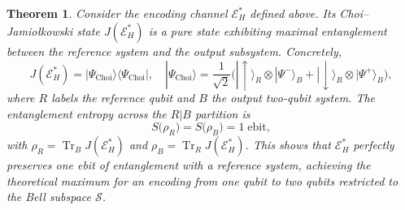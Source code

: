 \documentclass[10pt,a4paper]{amsart}
\newtheorem{theorem}{Theorem}
\begin{document}
\begin{theorem}\label{thm:entropy}
Consider the encoding channel $\mathcal{E}_H^*$ defined above. Its Choi–Jamiołkowski state $J(\mathcal{E}_H^*)$ is a pure state exhibiting maximal entanglement between the reference system and the output subsystem. Concretely,
\[
J(\mathcal{E}_H^*) = |\Psi_{\mathrm{Choi}}\rangle\langle\Psi_{\mathrm{Choi}}|,
\quad
|\Psi_{\mathrm{Choi}}\rangle = \frac{1}{\sqrt{2}}\bigl( |\uparrow\rangle_R \otimes |\Psi^-\rangle_B + |\downarrow\rangle_R \otimes |\Psi^+\rangle_B \bigr),
\]
where $R$ labels the reference qubit and $B$ the output two-qubit system. The entanglement entropy across the $R|B$ partition is
\[
S\bigl(\rho_R\bigr) = S\bigl(\rho_B\bigr) = 1 \; \text{ebit},
\]
with $\rho_R = \operatorname{Tr}_B J(\mathcal{E}_H^*)$ and $\rho_B = \operatorname{Tr}_R J(\mathcal{E}_H^*)$. This shows that $\mathcal{E}_H^*$ perfectly preserves one ebit of entanglement with a reference system, achieving the theoretical maximum for an encoding from one qubit to two qubits restricted to the Bell subspace $\mathcal{S}$.
\end{theorem}
\end{document}
